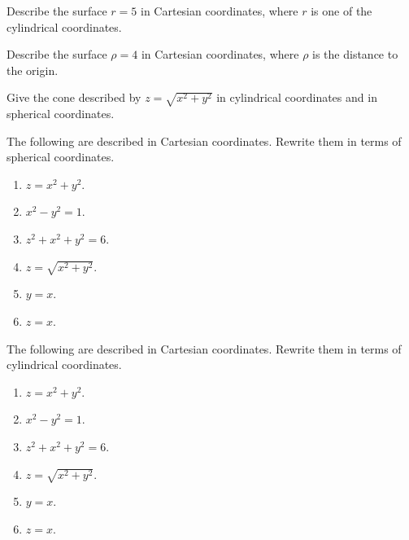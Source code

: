 \begin{enumialphparenastyle}
\begin{ex} Describe the surface $r=5$ in Cartesian coordinates, where 
$r$ is one of the cylindrical coordinates.
\end{ex}

\begin{ex} Describe the surface $\rho =4$ in Cartesian coordinates, 
where $\rho $ is the distance to the origin.
\end{ex}

\begin{ex} Give the cone described by $z=\sqrt{x^{2}+y^{2}}$ in cylindrical coordinates and
in spherical coordinates.
\end{ex}

\begin{ex} The following are described in Cartesian coordinates. Rewrite them in terms of spherical coordinates.

\begin{enumerate}
\item $z=x^{2}+y^{2}$.

\item $x^{2}-y^{2}=1$.

\item $z^{2}+x^{2}+y^{2}=6$.

\item $z=\sqrt{x^{2}+y^{2}}$.

\item $y=x$.

\item $z=x$.
\end{enumerate}
\end{ex}

\begin{ex} The following are described in Cartesian coordinates. Rewrite them in terms of cylindrical coordinates.

\begin{enumerate}
\item $z=x^{2}+y^{2}$.

\item $x^{2}-y^{2}=1$.

\item $z^{2}+x^{2}+y^{2}=6$.

\item $z=\sqrt{x^{2}+y^{2}}$.

\item $y=x$.

\item $z=x$.
\end{enumerate}
\end{ex}

\end{enumialphparenastyle}
